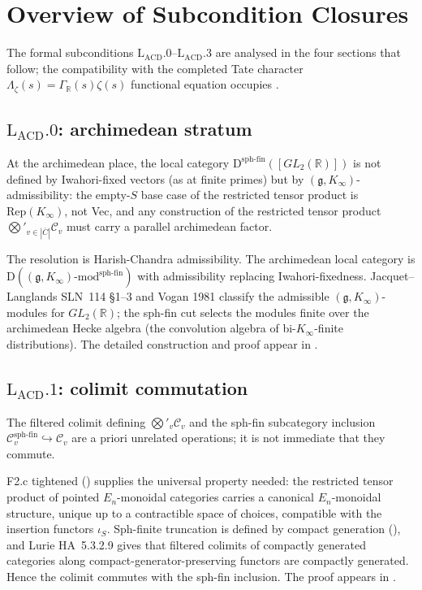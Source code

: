 \section{Overview of Subcondition Closures}
\label{v4-arith:lacd:table}

The formal subconditions \(\mathrm{L}_{\mathrm{ACD}}.0\)--\(\mathrm{L}_{\mathrm{ACD}}.3\)
are analysed in the four sections that follow; the compatibility
with the completed Tate character
\(\Lambda_{\zeta}(s) = \Gamma_{\mathbb{R}}(s)\zeta(s)\)
functional equation occupies .

\subsection{\(\mathrm{L}_{\mathrm{ACD}}.0\): archimedean stratum}

At the archimedean place, the local category
\(\mathrm{D}^{\mathrm{sph\text{-}fin}}([GL_{2}(\mathbb{R})])\)
is not defined by Iwahori-fixed vectors (as at finite primes) but by
\((\mathfrak{g}, K_{\infty})\)-admissibility: the empty-\(S\) base case
of the restricted tensor product is \(\mathrm{Rep}(K_{\infty})\), not Vec,
and any construction of the restricted tensor product
\(\bigotimes'_{v \in |\overline{C}|}\mathcal{C}_{v}\) must carry a
parallel archimedean factor.

The resolution is Harish-Chandra admissibility. The archimedean local
category is \(\mathrm{D}((\mathfrak{g}, K_{\infty})\text{-mod}^{\mathrm{sph\text{-}fin}})\)
with admissibility replacing Iwahori-fixedness.
Jacquet--Langlands SLN~114 \S1--3 and Vogan 1981 classify the admissible
\((\mathfrak{g}, K_{\infty})\)-modules for \(GL_{2}(\mathbb{R})\); the
sph-fin cut selects the modules finite over the archimedean Hecke algebra
(the convolution algebra of bi-\(K_{\infty}\)-finite distributions).
The detailed construction and proof appear in .

\subsection{\(\mathrm{L}_{\mathrm{ACD}}.1\): colimit commutation}

The filtered colimit defining \(\bigotimes'_{v}\mathcal{C}_{v}\) and
the sph-fin subcategory inclusion
\(\mathcal{C}_{v}^{\mathrm{sph\text{-}fin}} \hookrightarrow \mathcal{C}_{v}\)
are a priori unrelated operations; it is not immediate that they commute.

F2.c tightened () supplies the
universal property needed: the restricted tensor product of pointed
\(E_{n}\)-monoidal categories carries a canonical \(E_{n}\)-monoidal
structure, unique up to a contractible space of choices, compatible with
the insertion functors \(\iota_{S}\). Sph-finite truncation is defined by
compact generation (), and
Lurie HA~5.3.2.9 gives that filtered colimits of compactly generated
categories along compact-generator-preserving functors are compactly
generated. Hence the colimit commutes with the sph-fin inclusion. The
proof appears in .


